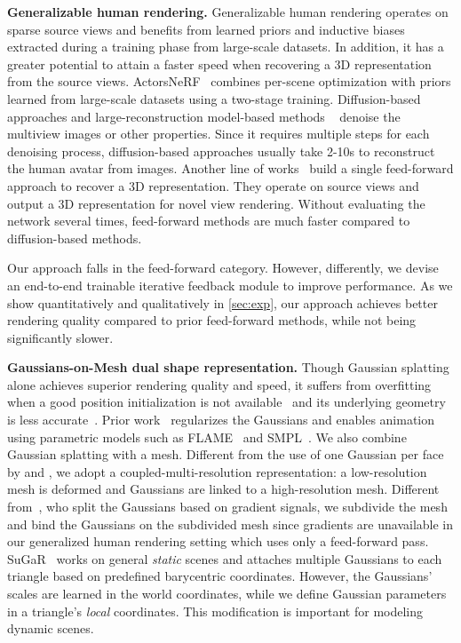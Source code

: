 \textbf{Generalizable human rendering.} Generalizable human rendering operates on sparse source views and benefits from learned priors and inductive biases extracted during a training phase from large-scale datasets. In addition, it has a greater potential to attain a faster speed when recovering a 3D representation from the source views. ActorsNeRF~\citep{mu2023actorsnerf} combines per-scene optimization with priors learned from large-scale datasets using a two-stage training. Diffusion-based approaches and large-reconstruction model-based methods ~\citep{weng2024single,  chen2024generalizable, xue2024human, kolotouros2024avatarpopup, pan2024humansplat} denoise the multiview images or other properties. %
Since it requires multiple steps for each denoising process, diffusion-based approaches usually take 2-10s to reconstruct the human avatar from images. Another line of works~\citep{remelli2022drivable, hu2023sherf, kwon2021neural, kwon2023neural, li2024ghunerf, pan2023transhuman, zheng2024gpsgaussian} build a single feed-forward approach to recover a 3D representation. They operate on source views and output a  3D representation for novel view rendering. Without evaluating the network  several times, feed-forward methods are much faster  compared to diffusion-based methods.

Our approach falls in the feed-forward category. However, differently, we devise an end-to-end trainable iterative feedback module to improve performance.  As we show quantitatively and qualitatively in \cref{sec:exp}, our approach achieves better rendering quality compared to prior feed-forward methods, while not being significantly slower.

\textbf{Gaussians-on-Mesh dual shape representation.} 
Though Gaussian splatting alone achieves superior rendering quality and speed, it suffers from overfitting when a good position initialization is not available~\citep{wen2024gomavatar} and its underlying geometry is less accurate~\citep{paudel2024ihuman, qian2023gaussianavatars}. 
Prior work~\citep{wen2024gomavatar, paudel2024ihuman} regularizes the Gaussians and enables animation using parametric models such as FLAME~\citep{FLAME:SiggraphAsia2017} and SMPL~\citep{loper2015smpl}.
We also combine Gaussian splatting with a mesh. Different from the use of one Gaussian per face by \cite{wen2024gomavatar} and \cite{paudel2024ihuman}, we adopt a coupled-multi-resolution representation: a low-resolution mesh is deformed and Gaussians are linked to a high-resolution mesh. Different from~\cite{qian2023gaussianavatars}, who split the Gaussians based on gradient signals, we subdivide the mesh and bind the Gaussians on the subdivided mesh since  gradients are unavailable in our generalized human rendering setting which uses only a feed-forward pass. SuGaR~\citep{guedon2024sugar} works on general \textit{static} scenes and attaches multiple Gaussians to each triangle based on predefined barycentric coordinates. However, the Gaussians' scales are learned in the world coordinates, while we define Gaussian parameters in a triangle's \textit{local} coordinates. %
This modification is important for modeling dynamic scenes. 

